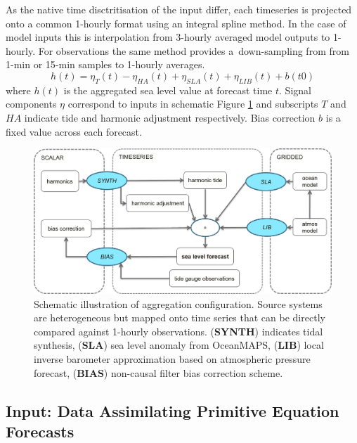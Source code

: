 As the native time disctritisation of the input differ, each timeseries is projected onto a common 1-hourly format using an integral spline method.  
In the case of model inputs this is interpolation from 3-hourly averaged model outputs to 1-hourly.  
For observations the same method provides a~down-sampling from from 1-min or 15-min samples to 1-hourly averages.  
\begin{equation}
h(t) = \eta_{T}(t) - \eta_{HA}(t) + \eta_{SLA}(t) + \eta_{LIB}(t) + b(t0)
\label{eq:aggSL}
\end{equation}
where $h(t)$ is the aggregated sea level value at forecast time $t$.  
Signal components $\eta$ correspond to inputs in schematic Figure \ref{fig:aggSL} and subscripts $T$ and $HA$ indicate tide and harmonic adjustment respectively.    
Bias correction $b$ is a fixed value across each forecast.
\vspace{6pt}
\begin{figure}[H]
\centering
\includegraphics[width=1.0\textwidth]{figures/diagrams/aggSL_schematic_abstract.png}
\caption{Schematic illustration of aggregation configuration.  Source systems are heterogeneous but mapped onto time series that can be directly compared against 1-hourly observations.  (\textbf{SYNTH}) indicates tidal synthesis, (\textbf{SLA}) sea level anomaly from OceanMAPS, (\textbf{LIB}) local inverse barometer approximation based on atmospheric pressure forecast, (\textbf{BIAS}) non-causal filter bias correction scheme. }
\label{fig:aggSL}
\end{figure}   



\subsection{ Input: Data Assimilating Primitive Equation Forecasts }
\label{sec:dynamicmodels}

